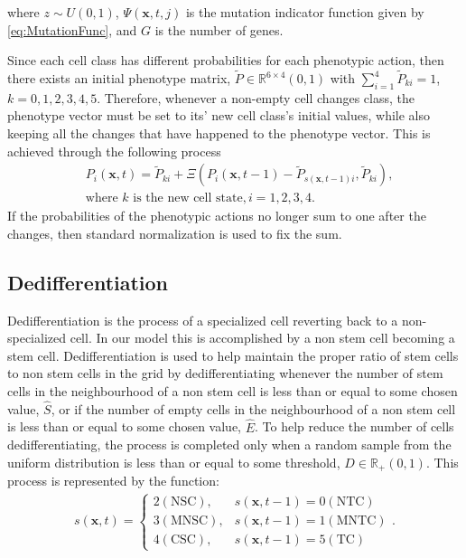 \documentclass[\main/thesis.tex]{subfiles}
\begin{document}
where $z {\sim} U(0, 1)$, $\Psi(\boldsymbol{x}, t, j)$ is the mutation indicator function given by \eqref{eq:MutationFunc}, and $G$ is the number of genes.

Since each cell class has different probabilities for each phenotypic action, then 
there exists an initial phenotype matrix, $\tilde{P} {\in} \mathbb{R}^{6{\times}4}(0, 1)$ 
with $\sum_{i{=}1}^{4} \tilde{P}_{ki} {=} 1$, $k {=} 0, 1, 2, 3, 4, 5$.
Therefore, whenever a non-empty cell changes class, the phenotype vector 
must be set to its' new cell class's initial values, while also keeping all the 
changes that have happened to the phenotype vector. This is achieved through the following process
\begin{align}
&P_i(\boldsymbol{x}, t) {=} \tilde{P}_{ki} {+} \Xi(P_i(\boldsymbol{x}, t{-}1)
                                                      {-} \tilde{P}_{s(\boldsymbol{x}, t{-}1)i},
                                                          \tilde{P}_{ki}), 
\label{eq:PhenotypeTransferFunc}\\
& \text{where } k \text{ is the new cell state}, i {=} 1, 2, 3, 4.\nonumber 
\end{align}
If the probabilities of the phenotypic actions no longer sum to one after the changes, then standard normalization is used to fix the sum.

\subsection{Dedifferentiation}
Dedifferentiation is the process of a specialized cell reverting back to a non-specialized cell. In our model this is accomplished by a non stem cell becoming a stem cell. Dedifferentiation is used to help maintain the proper ratio of stem cells to non stem cells in the grid by dedifferentiating whenever the number of stem cells in the neighbourhood of a non stem cell is less than or equal to some chosen value, $\hat{S}$, or if the number of empty cells in the neighbourhood of a non stem cell is less than or equal to some chosen value, $\hat{E}$. To help reduce the number of cells dedifferentiating, the process is completed only when a random sample from the uniform distribution is less than or equal to some threshold, $\hat{D} {\in} \mathbb{R}_+(0, 1)$. This process is represented by the function:
\begin{align}
s(\boldsymbol{x}, t) {=} \begin{cases}
                 2 (\text{NSC}), & s(\boldsymbol{x}, t{-}1) {=} 0 (\text{NTC})
                 \\
                 3 (\text{MNSC}), & s(\boldsymbol{x}, t{-}1) {=} 1 (\text{MNTC})
                 \\
                 4 (\text{CSC}), & s(\boldsymbol{x}, t{-}1) {=} 5 (\text{TC})
               \end{cases}.
\label{eq:DeDifferentiationFunction}
\end{align}
\end{document}
